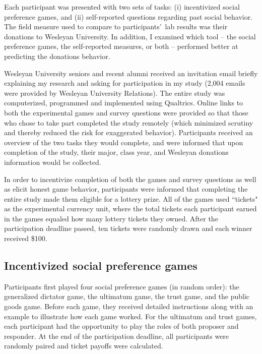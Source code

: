 \documentclass[12pt]{article}
\begin{document}
Each participant was presented with two sets of tasks: (i) incentivized social preference games, and (ii) self-reported questions regarding past social behavior. The field measure used to compare to participants\rq \ lab results was their donations to Wesleyan University.  In addition, I examined which tool -- the social preference games, the self-reported measures, or both -- performed better at predicting the donations behavior.
 
Wesleyan University seniors and recent alumni received an invitation email briefly explaining my research and asking for participation in my study (2,004 emails were provided by Wesleyan University Relations). The entire study was computerized, programmed and implemented using Qualtrics. Online links to both the experimental games and survey questions were provided so that those who chose to take part completed the study remotely (which minimized scrutiny and thereby reduced the risk for exaggerated behavior). Participants received an overview of the two tasks they would complete, and were informed that upon completion of the study, their major, class year, and Wesleyan donations information would be collected.

In order to incentivize completion of both the games and survey questions as well as elicit honest game behavior, participants were informed that completing the entire study made them eligible for a lottery prize. All of the games used ``tickets" as the experimental currency unit, where the total tickets each participant earned in the games equaled how many lottery tickets they owned. After the participation deadline passed, ten tickets were randomly drawn and each winner received \$100.


\subsection{Incentivized social preference games}


Participants first played four social preference games (in random order): the generalized dictator game, the ultimatum game, the trust game, and the public goods game. Before each game, they received detailed instructions along with an example to illustrate how each game worked. For the ultimatum and trust games, each participant had the opportunity to play the roles of both proposer and responder. At the end of the participation deadline, all participants were randomly paired and ticket payoffs were calculated.
\end{document}
